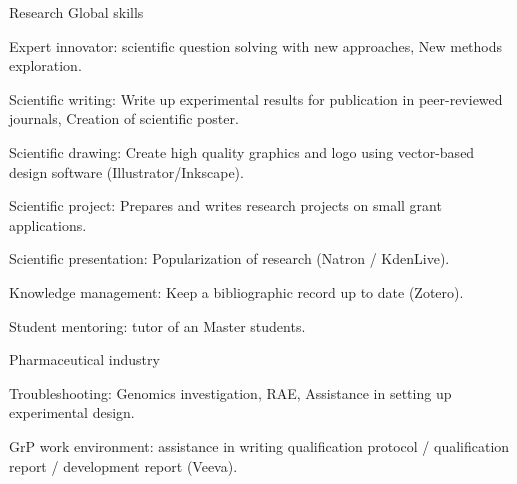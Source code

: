

\begin{cventries}

  \cventry
    {Research} %
    {Global skills} %
    {} %
    {} %
    {
      \begin{cvitems} %
        \item {Expert innovator: scientific question solving with new approaches, New methods exploration.}
        \item {Scientific writing: Write up experimental results for publication in peer-reviewed journals, Creation of scientific poster.}
        \item {Scientific drawing: Create high quality graphics and logo using vector-based design software (Illustrator/Inkscape).}
        \item {Scientific project: Prepares and writes research projects on small grant applications.}
        \item {Scientific presentation: Popularization of research (Natron / KdenLive).}
        \item {Knowledge management: Keep a bibliographic record up to date (Zotero).}
        \item {Student mentoring: tutor of an Master students.}
      \end{cvitems}
    }
    
  \cventry
    {Pharmaceutical industry} %
    {} %
    {} %
    {} %
    {
      \begin{cvitems} %
        \item {Troubleshooting: Genomics investigation, RAE, Assistance in setting up experimental design.}
        \item {GrP work environment: assistance in writing qualification protocol / qualification report / development report (Veeva).}
      \end{cvitems}
    }



\end{cventries}
